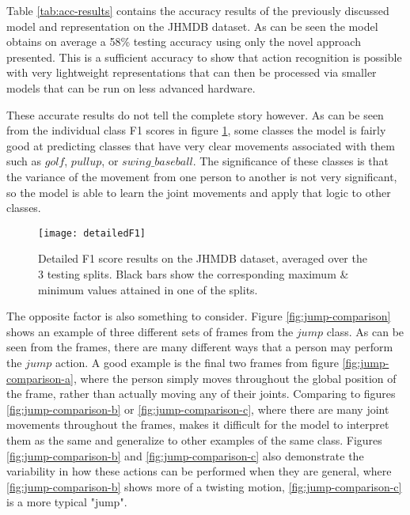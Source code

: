 Table \ref{tab:acc-results} contains the accuracy results of the previously discussed model and representation on the JHMDB dataset. As can be seen the model obtains on average a 58\% testing accuracy using only the novel approach presented. This is a sufficient accuracy to show that action recognition is possible with very lightweight representations that can then be processed via smaller models that can be run on less advanced hardware.

These accurate results do not tell the complete story however. As can be seen from the individual class F1 scores in figure \ref{fig:detailed-f1}, some classes the model is fairly good at predicting classes that have very clear movements associated with them such as $golf$, $pullup$, or $swing\_baseball$. The significance of these classes is that the variance of the movement from one person to another is not very significant, so the model is able to learn the joint movements and apply that logic to other classes.

\begin{figure}[ht]
	\texttt{[image: detailedF1]}
	\centering
	\caption{Detailed F1 score results on the JHMDB dataset, averaged over the 3 testing splits. Black bars show the corresponding maximum \& minimum values attained in one of the splits.}
	\label{fig:detailed-f1}
\end{figure}

The opposite factor is also something to consider. Figure \ref{fig:jump-comparison} shows an example of three different sets of frames from the $jump$ class. As can be seen from the frames, there are many different ways that a person may perform the $jump$ action. A good example is the final two frames from figure \ref{fig:jump-comparison-a}, where the person simply moves throughout the global position of the frame, rather than actually moving any of their joints. Comparing to figures \ref{fig:jump-comparison-b} or \ref{fig:jump-comparison-c}, where there are many joint movements throughout the frames, makes it difficult for the model to interpret them as the same and generalize to other examples of the same class. Figures \ref{fig:jump-comparison-b} and \ref{fig:jump-comparison-c} also demonstrate the variability in how these actions can be performed when they are general, where \ref{fig:jump-comparison-b} shows more of a twisting motion, \ref{fig:jump-comparison-c} is a more typical "jump".

